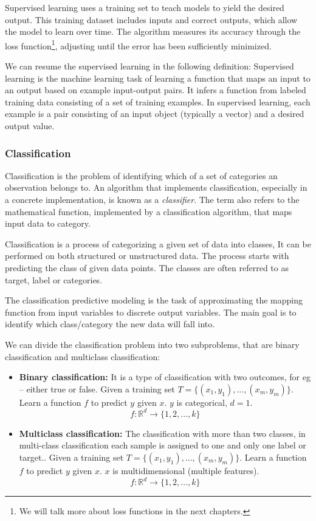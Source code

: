 Supervised learning uses a training set to teach models to yield the desired output. This training dataset includes inputs and correct outputs, which allow the model to learn over time. The algorithm measures its accuracy through the loss function\footnote{We will talk more about loss functions in the next chapters.}, adjusting until the error has been sufficiently minimized.

We can resume the supervised learning in the following definition: Supervised learning is the machine learning task of learning a function that maps an input to an output based on example input-output pairs. It infers a function from labeled training data consisting of a set of training examples. In supervised learning, each example is a pair consisting of an input object (typically a vector) and a desired output value.

\subsubsection{Classification}
Classification is the problem of identifying which of a set of categories an observation belongs to. An algorithm that implements classification, especially in a concrete implementation, is known as a \emph{classifier}. The term also refers to the mathematical function, implemented by a classification algorithm, that maps input data to category.

Classification is a process of categorizing a given set of data into classes, It can be performed on both structured or unstructured data. The process starts with predicting the class of given data points. The classes are often referred to as target, label or categories.

The classification predictive modeling is the task of approximating the mapping function from input variables to discrete output variables. The main goal is to identify which class/category the new data will fall into.

We can divide the classification problem into two subproblems, that are binary classification and multiclass classification:
\begin{itemize}
\item \textbf{Binary classification: } It is a type of classification with two outcomes, for eg – either true or false. Given a training set \(T = \{(x_1,y_1), ..., (x_m, y_m)\}\). Learn a function \(f\) to predict \(y\) given \(x\). \(y\) is categorical, \(d=1\).
\[f: \mathbb{R}^d \to \{1,2,...,k\}\]
\item \textbf{Multiclass classification: } The classification with more than two classes, in multi-class classification each sample is assigned to one and only one label or target.. Given a training set \(T = \{(x_1,y_1), ..., (x_m, y_m)\}\). Learn a function \(f\) to predict \(y\) given \(x\). \(x\) is multidimensional (multiple features).
\[f: \mathbb{R}^d \to \{1,2,...,k\}\]
\end{itemize}

